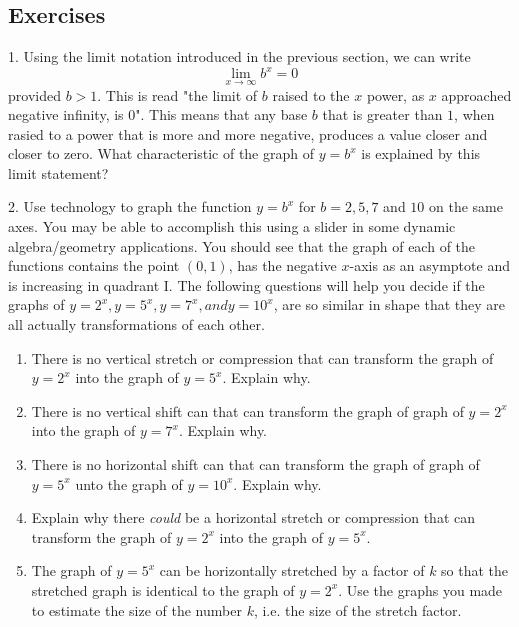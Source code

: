 \documentclass[10pt,]{book}
\theoremstyle{plain}
\theoremstyle{definition}
\theoremstyle{definition}
\theoremstyle{definition}
\numberwithin{equation}{section}
\newcommand{\gt}{>}
\begin{document}
\subsection[{Exercises}]{Exercises}\label{exercises-9}
\begin{exerciselist}
\item[1.]\hypertarget{exercise-60}{}\hypertarget{p-256}{}%
Using the limit notation introduced in the previous section, we can write%
\begin{equation*}
\lim_{x \to \infty} b^x = 0
\end{equation*}
provided \(b \gt 1\). This is read "the limit of \(b\) raised to the \(x\) power, as \(x\) approached negative infinity, is \(0\)". This means that any base \(b\) that is greater than \(1\), when rasied to a power that is more and more negative, produces a value closer and closer to zero. What characteristic of the graph of \(y=b^x\) is explained by this limit statement?%
\par\smallskip
\item[2.]\hypertarget{exercise-61}{}\hypertarget{p-257}{}%
Use technology to graph the function  \(y=b^x\) for \(b = 2, 5, 7\) and \(10\) on the same axes. You may be able to accomplish this using a slider in some dynamic algebra/geometry applications. You should see that the graph of each of the functions contains the point \((0,1)\), has the negative \(x\)-axis as an asymptote and is increasing in quadrant I. The following questions will help you decide if the graphs of \(y=2^x, y=5^x, y=7^x,and y=10^x\), are so similar in shape that they are all actually transformations of each other.%
\leavevmode%
\begin{enumerate}[label=(\alph*)]
\item\hypertarget{li-115}{}There is no vertical stretch or compression that can transform the graph of \(y=2^x\) into the graph of \(y=5^x\).  Explain why.%
\item\hypertarget{li-116}{}There is no vertical shift can that can transform the graph of graph of \(y=2^x\) into the graph of \(y=7^x\). Explain why.%
\item\hypertarget{li-117}{}There is no horizontal shift can that can transform the graph of graph of \(y=5^x\) unto the graph of \(y=10^x\). Explain why.%
\item\hypertarget{li-118}{}Explain why there \emph{could} be a horizontal stretch or compression that can transform the graph of \(y=2^x\) into the graph of \(y=5^x\).%
\item\hypertarget{li-119}{}The graph of \(y=5^x\) can be horizontally stretched by a factor of \(k\) so that the stretched graph is identical to the graph of \(y=2^x\). Use the graphs you made to estimate the size of the number \(k\), i.e. the size of the stretch factor.%
\end{enumerate}
\par\smallskip
\end{exerciselist}
\typeout{************************************************}
\typeout{************************************************}
\end{document}
